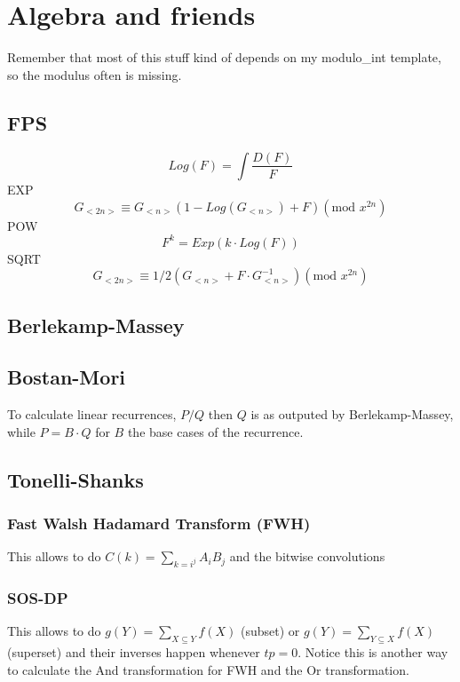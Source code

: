 \documentclass[landscape, 9pt, a4paper, oneside, twocolumn]{extarticle}
\begin{document}
\section{Algebra and friends}
	Remember that most of this stuff kind of depends on my modulo\_int template, so the modulus often is missing.
	
	\subsection{FPS}
	
	$$Log(F)=\int\frac{D(F)}{F}$$
	EXP
	$$ G_{<2n>}\equiv G_{<n>}\left(1-Log(G_{<n>})+F \right)(\text{mod }x^{2n})$$
	POW
	$$ F^k=Exp(k\cdot Log(F))$$
	SQRT
	$$G_{<2n>}\equiv 1/2(G_{<n>}+F\cdot G_{<n>}^{-1})(\text{mod }x^{2n})$$
	\subsection{Berlekamp-Massey}
	
	\subsection{Bostan-Mori}
To calculate linear recurrences, $P/Q$ then $Q$ is as outputed by Berlekamp-Massey, while $P=B\cdot Q$ for $B$ the base cases of the recurrence.
	
	\subsection{Tonelli-Shanks}
	
	
	\subsubsection{Fast Walsh Hadamard Transform (FWH)}
	This allows to do $C(k)=\sum_{k=i^j}A_iB_j$ and the bitwise convolutions
	
	
	\subsubsection{SOS-DP}
	This allows to do $g(Y)=\sum_{X\subseteq Y}f(X)$ (subset) or $g(Y)=\sum_{Y\subseteq X}f(X)$ (superset) and their inverses happen whenever $tp=0$. Notice this is another way to calculate the And transformation for FWH and the Or transformation.
	
\end{document}
